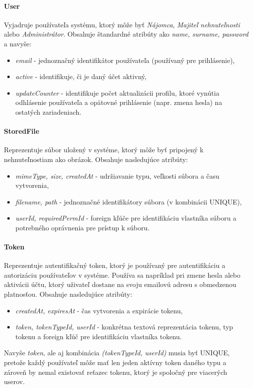 \paragraph{User} \text{ } \newline
Vyjadruje používateľa systému, ktorý môže byť \textit{Nájomca}, \textit{Majiteľ nehnuteľnosti} alebo \textit{Administrátor}. 
Obsahuje štandardné atribúty ako \textit{name, surname, password} a navyše:
\begin{itemize}[itemsep=2pt]
    \item \textit{email} - jednoznačný identifikátor používateľa (používaný pre prihlásenie),
    \item \textit{active} - identifikuje, či je daný účet aktivný,
    \item \textit{updateCounter} - identifikuje počet aktualizácii profilu, ktoré vynútia odhlásenie používateľa a opätovné prihlásenie (napr. zmena hesla) na ostatých zariadeniach.
\end{itemize}

\paragraph{StoredFile} \text{ } \newline
Reprezentuje súbor uložený v systéme, ktorý môže byť pripojený k nehnuteľnostiam ako obrázok.
Obsahuje nasledujúce atribúty:
\begin{itemize}[itemsep=2pt]
    \item \textit{mimeType, size, createdAt} - udržiavanie typu, veľkosti súbora a času vytvorenia,
    \item \textit{filename, path} - jednoznačné identifikátory súbora (v kombinácii UNIQUE),
    \item \textit{userId, requiredPermId} - foreign kľúče pre identifikáciu vlastníka súboru a potrebného oprávnenia pre prístup k súboru.
\end{itemize}

\paragraph{Token} \text{ } \newline
Reprezentuje autentifikačný token, ktorý je používaný pre autentifikáciu a autorizáciu používateľov v systéme. 
Používa sa napríklad pri zmene hesla alebo aktivácii účtu, ktorý uživateľ dostane na svoju emailovú adresu s obmedzenou platnosťou.
Obsahuje nasledujúce atribúty:
\begin{itemize}[itemsep=2pt]
    \item \textit{createdAt, expiresAt} - čas vytvorenia a expirácie tokenu,
    \item \textit{token, tokenTypeId, userId} - konkrétna textová reprezentácia tokenu, typ tokenu a foreign kľúč pre identifikáciu vlastníka tokenu.
\end{itemize}
Navyše \textit{token}, ale aj kombinácia \textit{(tokenTypeId, userId)} musia byť UNIQUE, pretože každý používateľ môže mať len jeden aktívny token daného typu a zároveň by nemal existovať reťazec tokenu, ktorý je spoločný pre viacerých userov.

